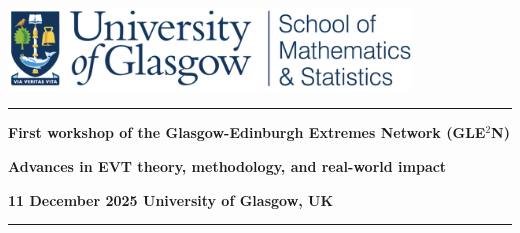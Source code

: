 \begin{titlepage}
\centering

\includegraphics[width=0.8\textwidth]{UofGMS_header.png}

\vspace*{4cm}

\noindent\rule{\textwidth}{1pt}
{\Huge \bfseries First workshop of the Glasgow-Edinburgh Extremes Network (GLE$^2$N) \par}

{\Large \bfseries Advances in EVT theory, methodology, and real-world impact\par}

{\large \bfseries 11 December 2025 University of Glasgow, UK\par}

\noindent\rule{\textwidth}{1pt}
\vspace{1.5cm}






\end{titlepage}
\clearpage
\setcounter{page}{1}
